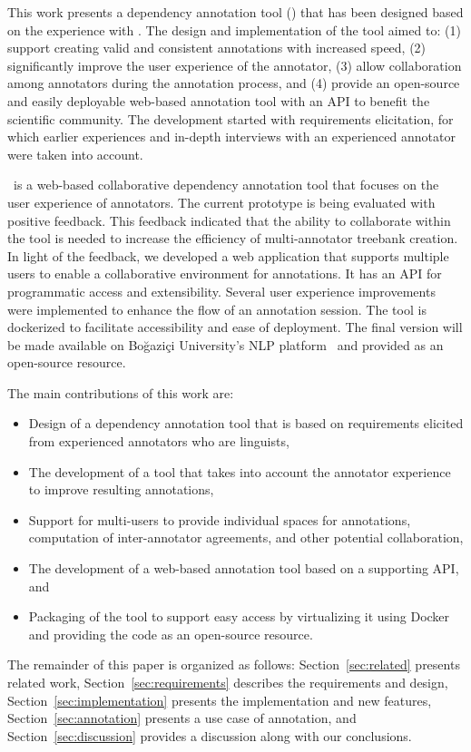 This work presents a dependency annotation tool (\boatvtwo) that has been designed based on the experience with \boatvone.
The design and implementation of the tool aimed to: (1) support creating valid and consistent annotations with increased speed, (2) significantly improve the user experience of the annotator, (3) allow collaboration among annotators during the annotation process, and (4) provide an open-source and easily deployable web-based annotation tool with an API to benefit the scientific community.
The development started with requirements elicitation, for which earlier experiences and in-depth interviews with an experienced annotator were taken into account.

\boatvtwo\ is a web-based collaborative dependency annotation tool that focuses on the user experience of annotators.
The current prototype is being evaluated with positive feedback.
This feedback indicated that the ability to collaborate within the tool is needed to increase the efficiency of multi-annotator treebank creation.
In light of the feedback, we developed a web application that supports multiple users to enable a collaborative environment for annotations.
It has an API for programmatic access and extensibility.
Several user experience improvements were implemented to enhance the flow of an annotation session.
The tool is dockerized to facilitate accessibility and ease of deployment.
The final version will be made available on Boğaziçi University's NLP platform~\cite{DIP} and provided as an open-source resource.

The main contributions of this work are:
\begin{itemize}
\setlength\itemsep{0em}
        \item Design of a dependency annotation tool that is based on requirements elicited from experienced annotators who are linguists,
        \item The development of a tool that takes into account the annotator experience to improve resulting annotations,
        \item Support for multi-users to provide individual spaces for annotations, computation of inter-annotator agreements, and other potential collaboration,
        \item The development of a web-based annotation tool based on a supporting API, and
        \item Packaging of the tool to support easy access by virtualizing it using Docker~\cite{docker} and providing the code as an open-source resource.
\end{itemize}

The remainder of this paper is organized as follows:
Section~\ref{sec:related} presents related work,
Section~\ref{sec:requirements} describes the requirements and design,
Section~\ref{sec:implementation} presents the implementation and new features,
Section~\ref{sec:annotation} presents a use case of annotation, and
Section~\ref{sec:discussion} provides a discussion along with our conclusions.

